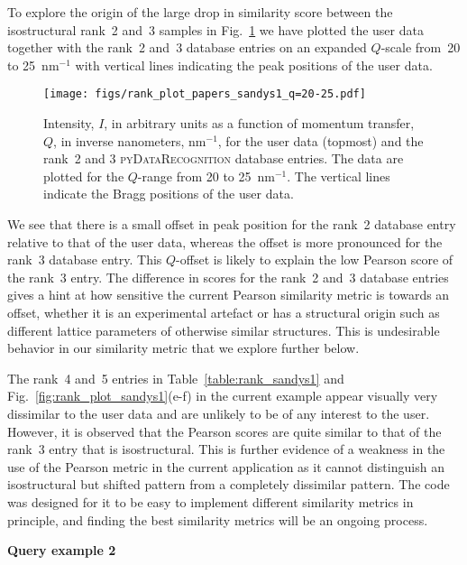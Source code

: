 \documentclass[preprint]{iucr}
\newcommand{\fig}[1]{Fig.~\ref{fig:#1}}
\newcommand{\tabl}[1]{Table~\ref{table:#1}}
\newcommand{\pydr}{\textsc{pyDataRecognition}\xspace}
\begin{document}
To explore the origin of the large drop in similarity score between the isostructural rank~2 and~3 samples in \fig{rank_plot_sandys1_zoom} we have plotted the user data together with the rank~2 and~3 database entries on an expanded $Q$-scale from~20 to 25~nm$^{-1}$ with vertical lines indicating the peak positions of the user data. 
% 
\begin{figure}
    \texttt{[image: figs/rank\_plot\_papers\_sandys1\_q=20-25.pdf]}
    \label{fig:rank_plot_sandys1_zoom}
    \caption{Intensity, $I$, in arbitrary units as a function of momentum transfer, $Q$, in inverse nanometers, $\mathrm{nm}^{-1}$, for the user data (topmost) and the rank~2 and 3 \pydr database entries.
    The data are plotted for the $Q$-range from 20 to 25~nm$^{-1}$.
    The vertical lines indicate the Bragg positions of the user data.}
\end{figure}
% 
We see that there is a small offset in peak position for the rank~2 database entry relative to that of the user data, whereas the offset is more pronounced for the rank~3 database entry. This $Q$-offset is likely to explain the low Pearson score of the rank~3 entry. The difference in scores for the rank~2 and~3 database entries gives a hint at how sensitive the current Pearson similarity metric is towards an offset, whether it is an experimental artefact or has a structural origin such as different lattice parameters of otherwise similar structures.
This is undesirable behavior in our similarity metric that we explore further below. 

The rank~4 and~5 entries in \tabl{rank_sandys1} and \fig{rank_plot_sandys1}(e-f) in the current example appear visually very dissimilar to the user data and are unlikely to be of any interest to the user. However, it is observed that the Pearson scores are quite similar to that of the rank~3 entry that is isostructural.  This is further evidence of a weakness in the use of the Pearson metric in the current application as it cannot distinguish an isostructural but shifted pattern from a completely dissimilar pattern.  The code was designed for it to be easy to implement different similarity metrics in principle, and finding the best similarity metrics will be an ongoing process.

\textbf{Query example 2}
\end{document}
